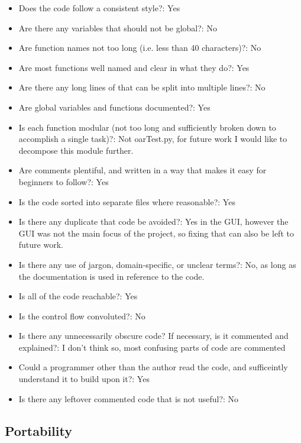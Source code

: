 \documentclass[12pt, titlepage]{article}
\begin{document}
\begin{emumerate}
\begin{enumerate}
  \begin{itemize}
    \item{Does the code follow a consistent style?: Yes}
    \item{Are there any variables that should not be global?: No}
    \item{Are function names not too long (i.e. less than 40 characters)?: No}
    \item{Are most functions well named and clear in what they do?: Yes}
    \item{Are there any long lines of that can be split into multiple lines?: No}
    \item{Are global variables and functions documented?: Yes}
    \item{Is each function modular (not too long and sufficiently broken down to accomplish a single task)?: Not oarTest.py, for future work I would like to decompose this module further.}
    \item{Are comments plentiful, and written in a way that makes it easy for beginners to follow?: Yes}
    \item{Is the code sorted into separate files where reasonable?: Yes}
    \item{Is there any duplicate that code be avoided?: Yes in the GUI, however the GUI was not the main focus of the project, so fixing that can also be left to future work.}
    \item{Is there any use of jargon, domain-specific, or unclear terms?: No, as long as the documentation is used in reference to the code.}
    \item{Is all of the code reachable?: Yes}
    \item{Is the control flow convoluted?: No}
    \item{Is there any unnecessarily obscure code? If necessary, is it commented and explained?: I don't think so, most confusing parts of code are commented}
    \item{Could a programmer other than the author read the code, and sufficeintly understand it to build upon it?: Yes}
    \item{Is there any leftover commented code that is not useful?: No}
  \end{itemize}

\end{enumerate}


\subsection{Portability}


\end{emumerate}
\end{document}

